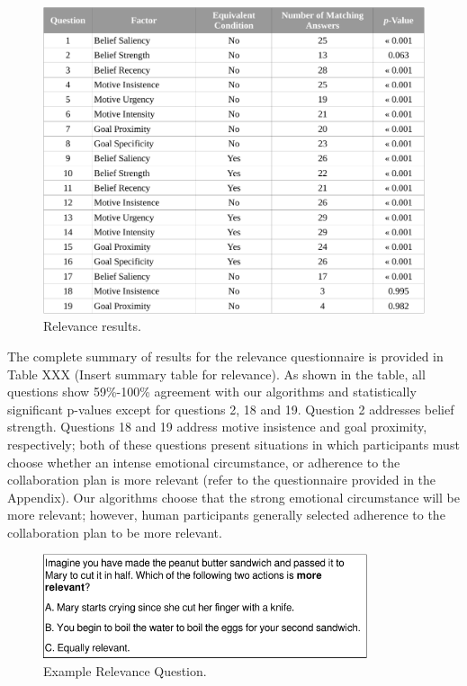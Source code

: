 \documentclass[12pt]{report}
\begin{document}
\begin{figure}[tbh]
  \centering
  \includegraphics[width=1\textwidth]{figure/relevance_result_croped.pdf}
  \caption{Relevance results.}
  \label{fig:relevance_result}
\end{figure}

The complete summary of results for the relevance questionnaire is provided in
Table XXX (Insert summary table for relevance). As shown in the table, all
questions show 59\%-100\% agreement with our algorithms and statistically
significant p-values except for questions 2, 18 and 19. Question 2 addresses
belief strength. Questions 18 and 19 address motive insistence and goal
proximity, respectively; both of these questions present situations in which
participants must choose whether an intense emotional circumstance, or adherence
to the collaboration plan is more relevant (refer to the questionnaire
provided in the Appendix). Our algorithms choose that the strong emotional
circumstance will be more relevant; however, human participants generally
selected adherence to the collaboration plan to be more relevant. 

\begin{figure}[tbh]
  \centering
  \includegraphics[width=0.85\textwidth]{figure/question-sample4-croped.pdf}
  \caption{{\fontsize{9}{9}\selectfont Example Relevance Question.}}
  \label{fig:qs4}
\end{figure}
\end{document}
